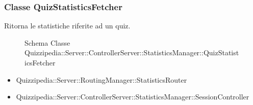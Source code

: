 \subsubsection{Classe QuizStatisticsFetcher}
Ritorna le statistiche riferite ad un quiz.
\begin{figure}[H]
\centering
\noindent{}
\caption[Schema Classe QuizStatisticsFetcher]{Schema Classe Quizzipedia::Server::ControllerServer::StatisticsManager::QuizStatisticsFetcher}
\end{figure}
\begin{itemize}
\item Quizzipedia::Server::RoutingManager::StatisticsRouter
\end{itemize}
\begin{itemize}
\item Quizzipedia::Server::ControllerServer::StatisticsManager::SessionController
\end{itemize}
